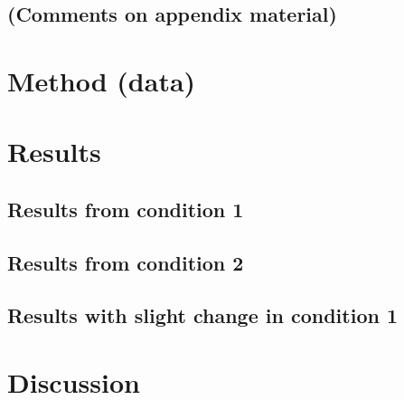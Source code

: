 \documentclass[reprint,english,notitlepage]{revtex4-1}
\begin{document}
\subsection{(Comments on appendix material)}


\section{Method (data)}



\section{Results}
\subsection{Results from condition 1}


\subsection{Results from condition 2}


\subsection{Results with slight change in condition 1}



\section{Discussion}
\end{document}
